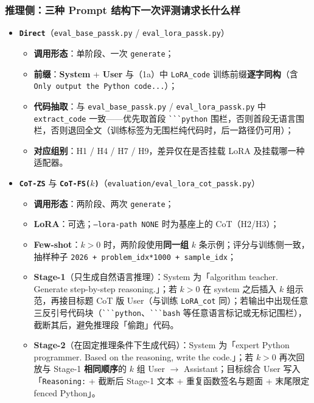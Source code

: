 \subsubsection{推理侧：三种 Prompt 结构下一次评测请求长什么样}
\begin{itemize}
    \item \textbf{\texttt{Direct}}（\texttt{eval\_base\_passk.py} / \texttt{eval\_lora\_passk.py}）
    \begin{itemize}
        \item \textbf{调用形态}：单阶段、一次 \texttt{generate}；
        \item \textbf{前缀}：\textbf{System} + \textbf{User} 与（1a）中 \texttt{LoRA\_code} 训练前缀\textbf{逐字同构}（含 \texttt{Only output the Python code...}）；
        \item \textbf{代码抽取}：与 \texttt{eval\_base\_passk.py} / \texttt{eval\_lora\_passk.py} 中 \texttt{extract\_code} 一致——优先取首段 \verb|```python| 围栏，否则首段无语言围栏，否则退回全文（训练标签为无围栏纯代码时，后一路径仍可用）；
        \item \textbf{对应组别}：H1 / H4 / H7 / H9，差异仅在是否挂载 LoRA 及挂载哪一种适配器。
    \end{itemize}
    \item \textbf{\texttt{CoT-ZS}} 与 \textbf{\texttt{CoT-FS($k$)}}（\texttt{evaluation/eval\_lora\_cot\_passk.py}）
    \begin{itemize}
        \item \textbf{调用形态}：两阶段、两次 \texttt{generate}；
        \item \textbf{LoRA}：可选；\texttt{--lora-path NONE} 时为基座上的 CoT（H2/H3）；
        \item \textbf{Few-shot}：$k{>}0$ 时，两阶段使用\textbf{同一组} $k$ 条示例；评分与训练侧一致，抽样种子 \texttt{2026 + problem\_idx*1000 + sample\_idx}；
        \item \textbf{Stage-1}（只生成自然语言推理）：System 为「algorithm teacher. Generate step-by-step reasoning.」；若 $k{>}0$ 在 system 之后插入 $k$ 组示范，再接目标题 CoT 版 User（与训练 \texttt{LoRA\_cot} 同）；若输出中出现任意三反引号代码块（\verb|```python|、\verb|```bash| 等任意语言标记或无标记围栏），截断其后，避免推理段「偷跑」代码。
        \item \textbf{Stage-2}（在固定推理条件下生成代码）：System 为「expert Python programmer. Based on the reasoning, write the code.」；若 $k{>}0$ 再次回放与 Stage-1 \textbf{相同顺序}的 $k$ 组 User $\rightarrow$ Assistant；目标综合 User 写入「\texttt{Reasoning:} + 截断后 Stage-1 文本 + 重复函数签名与题面 + 末尾限定 fenced Python」。

\end{itemize}
\end{itemize}
